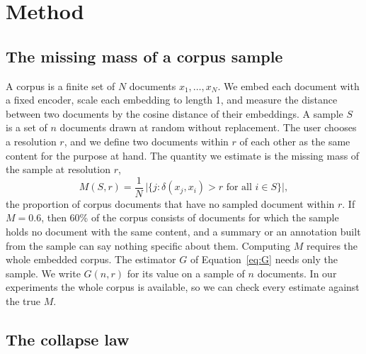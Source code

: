 \section{Method}

\subsection{The missing mass of a corpus sample}

A corpus is a finite set of $N$ documents $x_1, \dots, x_N$. We embed each document with a fixed encoder, scale each embedding to length 1, and measure the distance between two documents by the cosine distance of their embeddings. A sample $S$ is a set of $n$ documents drawn at random without replacement. The user chooses a resolution $r$, and we define two documents within $r$ of each other as the same content for the purpose at hand. The quantity we estimate is the missing mass of the sample at resolution $r$,
\begin{equation}
M(S, r) = \frac{1}{N}\,\big|\{j : \delta(x_j, x_i) > r \text{ for all } i \in S\}\big| ,
\end{equation}
the proportion of corpus documents that have no sampled document within $r$. If $M = 0.6$, then 60\% of the corpus consists of documents for which the sample holds no document with the same content, and a summary or an annotation built from the sample can say nothing specific about them. Computing $M$ requires the whole embedded corpus. The estimator $G$ of Equation~\ref{eq:G} needs only the sample. We write $G(n, r)$ for its value on a sample of $n$ documents. In our experiments the whole corpus is available, so we can check every estimate against the true $M$.

\subsection{The collapse law}

